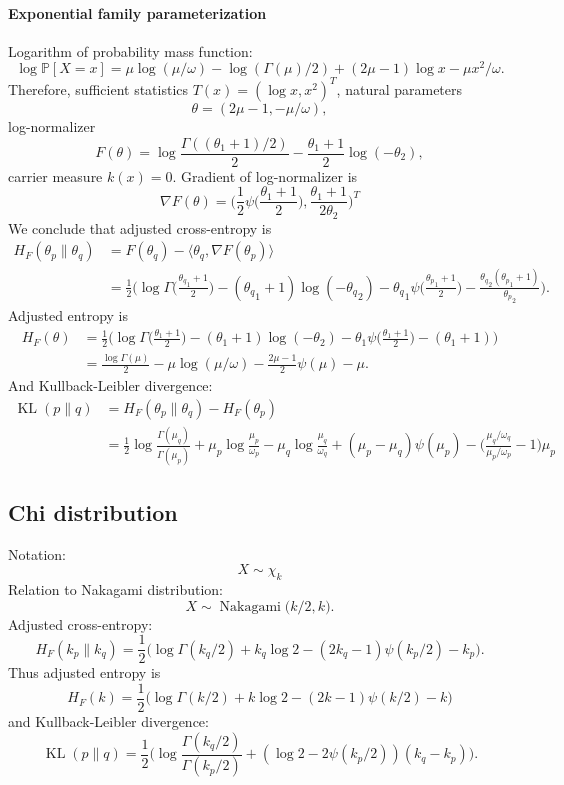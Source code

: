 \documentclass[a4paper,11pt]{article}
\theoremstyle{plain}
\theoremstyle{definition}
\newcommand{\MP}{\mathbb{P}}
\begin{document}
	\paragraph{Exponential family parameterization}
	Logarithm of probability mass function:
	\[
	\log \MP[X = x] = \mu \log (\mu / \omega) - \log(\Gamma(\mu)/2) + (2 \mu - 1) \log x - \mu x^2/\omega.
	\]
	Therefore, sufficient statistics $T(x) = (\log x, x^2)^T$, natural parameters 
	\[\theta = (2\mu-1, -\mu / \omega),\]
	log-normalizer 
	\[F(\theta) = \log \frac{\Gamma((\theta_1+1)/2)}{2} - \frac{\theta_1+1}{2} \log (-\theta_2) ,\]
	carrier measure $k(x) = 0$. Gradient of log-normalizer is 
	\[\nabla F(\theta) = \bigg(\frac{1}{2} \psi \Big(\frac{\theta_1+1}{2}\Big), \frac{\theta_1+1}{2 \theta_2} \bigg)^T\]
	We conclude that adjusted cross-entropy is
	\[
	\begin{aligned}
	H_F(\theta_p \| \theta_q) &= F(\theta_q) - \langle \theta_q, \nabla F(\theta_p) \rangle \\
	&= \frac{1}{2} \bigg( \log \Gamma\Big(\frac{{\theta_q}_1+1}{2}\Big) - ({\theta_q}_1+1) \log (-{\theta_q}_2) - {\theta_q}_1 \psi \Big(\frac{{\theta_p}_1+1}{2}\Big) - \frac{{\theta_q}_2({\theta_p}_1+1)}{{\theta_p}_2} \bigg).
	\end{aligned}
	\]
	Adjusted entropy is
	\[
	\begin{aligned}
	H_F(\theta) &= \frac{1}{2}\bigg(\log \Gamma\Big(\frac{\theta_1+1}{2}\Big) - (\theta_1+1) \log (-\theta_2) - \theta_1 \psi \Big(\frac{\theta_1+1}{2}\Big) - (\theta_1+1)\bigg) \\
	& = \frac{\log \Gamma(\mu)}{2} - \mu \log (\mu/\omega) - \frac{2\mu-1}{2} \psi(\mu) - \mu.
	\end{aligned}
	\]
	And Kullback-Leibler divergence:
	\[
	\begin{aligned}
	\operatorname{KL}(p \| q) &= H_F(\theta_p \| \theta_q) - H_F(\theta_p) \\
	&=\frac{1}{2} \log \frac{\Gamma (\mu_q)}{\Gamma(\mu_p)} + \mu_p \log\frac{\mu_p}{\omega_p} - \mu_q \log\frac{\mu_q}{\omega_q} + (\mu_p-\mu_q) \psi(\mu_p) - \bigg(\frac{\mu_q/\omega_q}{\mu_p/\omega_p} - 1\bigg)\mu_p 
	\end{aligned}
	\]
	
	
	\subsection{Chi distribution}
	Notation:
	\[
	X \sim \chi_k
	\]
	Relation to Nakagami distribution:
	\[
	X \sim \operatorname{Nakagami}\big(k/2, k\big).
	\]
	Adjusted cross-entropy:
	\[
	H_F(k_p \| k_q) = \frac{1}{2}\bigg(\log \Gamma(k_q/2) + k_q \log 2 - (2k_q-1)\psi(k_p/2) - k_p \bigg). 
	\]
	Thus adjusted entropy is
	\[
	H_F(k) = \frac{1}{2}\bigg(\log \Gamma(k/2) + k \log 2 - (2k-1)\psi(k/2) - k \bigg)
	\]
	and Kullback-Leibler divergence:
	\[
	\operatorname{KL}(p \| q) = \frac{1}{2} \bigg( \log \frac{\Gamma(k_q/2)}{\Gamma(k_p/2)} + (\log 2-2\psi(k_p/2))(k_q-k_p)\bigg).
	\]
	
\end{document}
